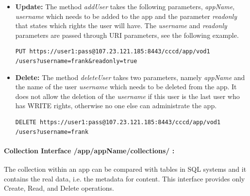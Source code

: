 \begin{itemize}
\item \textbf{Update:} The method \textit{addUser} takes the following parameters, \textit{appName}, \textit{username} which needs to be added to the app and the parameter \textit{readonly} that states which rights the user will have. The \textit{username} and \textit{readonly} parameters are passed through \ac{URI} parameters, see the following example.

\begin{code}
\begin{verbatim}
PUT https://user1:pass@107.23.121.185:8443/cccd/app/vod1
/users?username=frank&readonly=true
\end{verbatim}
\end{code}

\item \textbf{Delete:} The method \textit{deleteUser} takes two parameters, namely \textit{appName} and the name of the user \textit{username} which needs to be deleted from the app. It does not allow the deletion of the \textit{username} if this user is the last user who has WRITE rights, otherwise no one else can administrate the app.

\begin{code}
\begin{verbatim}
DELETE https://user1:pass@107.23.121.185:8443/cccd/app/vod1
/users?username=frank
\end{verbatim}
\end{code}

\end{itemize}

\paragraph{Collection Interface /app/{appName}/collections/ :} The collection within an app can be compared with tables in SQL systems and it contains the real data, i.e. the metadata for content. This interface provides only Create, Read, and Delete operations. 


